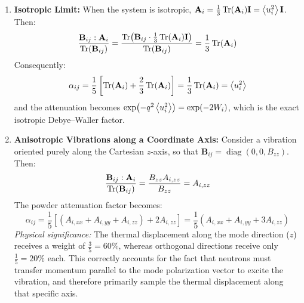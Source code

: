 \documentclass[11pt,a4paper]{article}
\begin{document}
\begin{enumerate}
    \item \textbf{Isotropic Limit:}
    When the system is isotropic, $\mathbf{A}_i = \frac{1}{3} \Tr(\mathbf{A}_i) \mathbf{I} = \ev{u_i^2} \mathbf{I}$. Then:
    \begin{equation}
    \frac{\mathbf{B}_{ij} : \mathbf{A}_i}{\Tr(\mathbf{B}_{ij})} = \frac{\Tr(\mathbf{B}_{ij} \cdot \frac{1}{3}\Tr(\mathbf{A}_i)\mathbf{I})}{\Tr(\mathbf{B}_{ij})} = \frac{1}{3} \Tr(\mathbf{A}_i)
    \end{equation}
    Consequently:
    \begin{equation}
    \alpha_{ij} = \frac{1}{5} \left[ \Tr(\mathbf{A}_i) + \frac{2}{3} \Tr(\mathbf{A}_i) \right] = \frac{1}{3} \Tr(\mathbf{A}_i) = \ev{u_i^2}
    \end{equation}
    and the attenuation becomes $\exp(-q^2 \ev{u_i^2}) = \exp(-2W_i)$, which is the exact isotropic Debye--Waller factor.

    \item \textbf{Anisotropic Vibrations along a Coordinate Axis:}
    Consider a vibration oriented purely along the Cartesian $z$-axis, so that $\mathbf{B}_{ij} = \operatorname{diag}(0, 0, B_{zz})$. Then:
    \begin{equation}
    \frac{\mathbf{B}_{ij} : \mathbf{A}_i}{\Tr(\mathbf{B}_{ij})} = \frac{B_{zz} A_{i, zz}}{B_{zz}} = A_{i, zz}
    \end{equation}
    The powder attenuation factor becomes:
    \begin{equation}
    \alpha_{ij} = \frac{1}{5} \left[ (A_{i, xx} + A_{i, yy} + A_{i, zz}) + 2 A_{i, zz} \right] = \frac{1}{5} (A_{i, xx} + A_{i, yy} + 3 A_{i, zz})
    \end{equation}
    \emph{Physical significance:} The thermal displacement along the mode direction ($z$) receives a weight of $\frac{3}{5} = 60\%$, whereas orthogonal directions receive only $\frac{1}{5} = 20\%$ each. This correctly accounts for the fact that neutrons must transfer momentum parallel to the mode polarization vector to excite the vibration, and therefore primarily sample the thermal displacement along that specific axis.
\end{enumerate}
\end{document}
